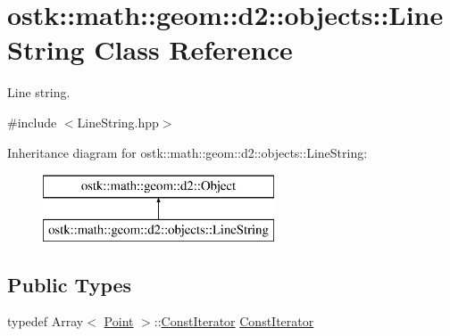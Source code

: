 \hypertarget{classostk_1_1math_1_1geom_1_1d2_1_1objects_1_1_line_string}{}\section{ostk\+:\+:math\+:\+:geom\+:\+:d2\+:\+:objects\+:\+:Line\+String Class Reference}
\label{classostk_1_1math_1_1geom_1_1d2_1_1objects_1_1_line_string}


Line string.  




{\ttfamily \#include $<$Line\+String.\+hpp$>$}

Inheritance diagram for ostk\+:\+:math\+:\+:geom\+:\+:d2\+:\+:objects\+:\+:Line\+String\+:\begin{figure}[H]
\begin{center}
\leavevmode
\includegraphics[height=2.000000cm]{classostk_1_1math_1_1geom_1_1d2_1_1objects_1_1_line_string}
\end{center}
\end{figure}
\subsection*{Public Types}
\begin{DoxyCompactItemize}
\item 
typedef Array$<$ \hyperlink{classostk_1_1math_1_1geom_1_1d2_1_1objects_1_1_point}{Point} $>$\+::\hyperlink{classostk_1_1math_1_1geom_1_1d2_1_1objects_1_1_line_string_a29e6326c716bef2ec438534cfdc1e118}{Const\+Iterator} \hyperlink{classostk_1_1math_1_1geom_1_1d2_1_1objects_1_1_line_string_a29e6326c716bef2ec438534cfdc1e118}{Const\+Iterator}
\end{DoxyCompactItemize}
